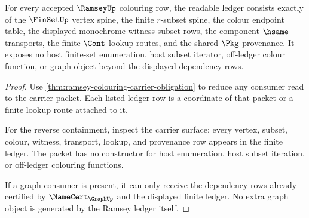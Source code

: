 \begin{theorem}
\label{thm:ramsey-finite-ledger-exactness}
For every accepted $\RamseyUp$ colouring row, the readable ledger consists
exactly of the $\FinSetUp$ vertex spine, the finite $r$-subset spine, the
colour endpoint table, the displayed monochrome witness subset rows, the
component $\hsame$ transports, the finite $\Cont$ lookup routes, and the
shared $\Pkg$ provenance. It exposes no host finite-set enumeration, host
subset iterator, off-ledger colour function, or graph object beyond the
displayed dependency rows.
\end{theorem}
\begin{proof}
Use \autoref{thm:ramsey-colouring-carrier-obligation} to reduce any consumer
read to the carrier packet. Each listed ledger row is a coordinate of that
packet or a finite lookup route attached to it.

For the reverse containment, inspect the carrier surface: every vertex,
subset, colour, witness, transport, lookup, and provenance row appears in the
finite ledger. The packet has no constructor for host enumeration, host subset
iteration, or off-ledger colouring functions.

If a graph consumer is present, it can only receive the dependency rows already
certified by $\NameCert_{\GraphUp}$ and the displayed finite ledger. No extra
graph object is generated by the Ramsey ledger itself.
\end{proof}

